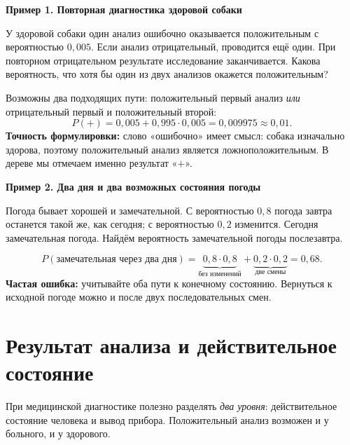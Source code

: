 \documentclass[a4paper,12pt]{article}
\newcommand{\smalltopic}[1]{\par\vspace{7pt}\noindent\textcolor{darkaccent}{\bfseries #1}\par\vspace{1pt}}
\newcommand{\important}[1]{\textcolor{darkaccent}{\bfseries #1}}
\newcommand{\ex}[1]{\needspace{9\baselineskip}\smalltopic{#1}}
\begin{document}
\ex{Пример 1. Повторная диагностика здоровой собаки}
У здоровой собаки один анализ ошибочно оказывается положительным с вероятностью $0{,}005$. Если анализ отрицательный, проводится ещё один. При повторном отрицательном результате исследование заканчивается. Какова вероятность, что хотя бы один из двух анализов окажется положительным?

\begin{center}
\end{center}
Возможны два подходящих пути: положительный первый анализ \emph{или} отрицательный первый и положительный второй:
\[
P(+)=0{,}005+0{,}995\cdot0{,}005=0{,}009975\approx0{,}01.
\]
\important{Точность формулировки:} слово «ошибочно» имеет смысл: собака изначально здорова, поэтому положительный анализ является ложноположительным. В дереве мы отмечаем именно результат «$+$».

\ex{Пример 2. Два дня и два возможных состояния погоды}
Погода бывает хорошей и замечательной. С вероятностью $0{,}8$ погода завтра останется такой же, как сегодня; с вероятностью $0{,}2$ изменится. Сегодня замечательная погода. Найдём вероятность замечательной погоды послезавтра.

\[
P(\text{замечательная через два дня})=
\underbrace{0{,}8\cdot0{,}8}_{\text{без изменений}}+
\underbrace{0{,}2\cdot0{,}2}_{\text{две смены}}=0{,}68.
\]
\important{Частая ошибка:} учитывайте оба пути к конечному состоянию. Вернуться к исходной погоде можно и после двух последовательных смен.

\section{Результат анализа и действительное состояние}
При медицинской диагностике полезно разделять \emph{два уровня}: действительное состояние человека и вывод прибора. Положительный анализ возможен и у больного, и у здорового.
\end{document}
